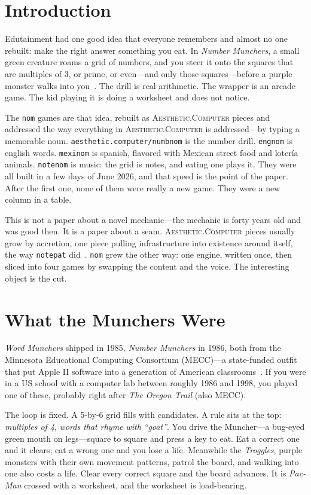 \documentclass[10pt,letterpaper,twocolumn]{article}
\newcommand{\ac}{\textsc{Aesthetic.Computer}}
\begin{document}
\section{Introduction}

Edutainment had one good idea that everyone remembers and almost no one rebuilt: make the right answer something you eat. In \emph{Number Munchers}, a small green creature roams a grid of numbers, and you steer it onto the squares that are multiples of 3, or prime, or even---and only those squares---before a purple monster walks into you~\citep{mecc1986number}. The drill is real arithmetic. The wrapper is an arcade game. The kid playing it is doing a worksheet and does not notice.

The \texttt{nom} games are that idea, rebuilt as \ac{} pieces and addressed the way everything in \ac{} is addressed---by typing a memorable noun. \texttt{aesthetic.computer/numbnom} is the number drill. \texttt{engnom} is english words. \texttt{mexinom} is spanish, flavored with Mexican street food and lotería animals. \texttt{notenom} is music: the grid is notes, and eating one plays it. They were all built in a few days of June 2026, and that speed is the point of the paper. After the first one, none of them were really a new game. They were a new column in a table.

This is not a paper about a novel mechanic---the mechanic is forty years old and was good then. It is a paper about a seam. \ac{} pieces usually grow by accretion, one piece pulling infrastructure into existence around itself, the way \texttt{notepat} did~\citep{scudder2026notepat}. \texttt{nom} grew the other way: one engine, written once, then sliced into four games by swapping the content and the voice. The interesting object is the cut.

\section{What the Munchers Were}

\emph{Word Munchers} shipped in 1985, \emph{Number Munchers} in 1986, both from the Minnesota Educational Computing Consortium (MECC)---a state-funded outfit that put Apple II software into a generation of American classrooms~\citep{mecc1985word,mecc1986number}. If you were in a US school with a computer lab between roughly 1986 and 1998, you played one of these, probably right after \emph{The Oregon Trail} (also MECC).

The loop is fixed. A 5-by-6 grid fills with candidates. A rule sits at the top: \emph{multiples of 4}, \emph{words that rhyme with} \emph{``goat''}. You drive the Muncher---a bug-eyed green mouth on legs---square to square and press a key to eat. Eat a correct one and it clears; eat a wrong one and you lose a life. Meanwhile the \emph{Troggles}, purple monsters with their own movement patterns, patrol the board, and walking into one also costs a life. Clear every correct square and the board advances. It is \emph{Pac-Man} crossed with a worksheet, and the worksheet is load-bearing.
\end{document}
